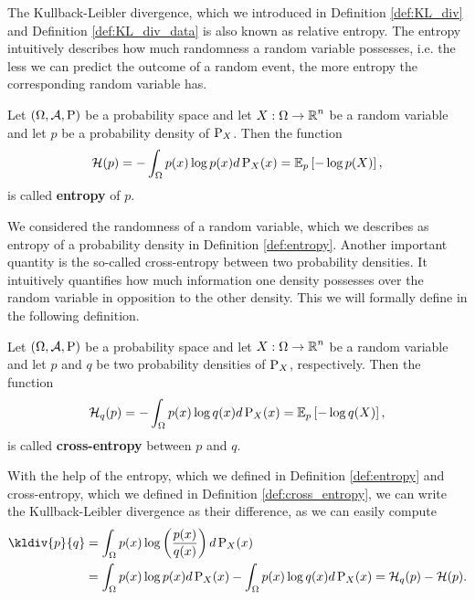 The Kullback-Leibler divergence, which we introduced in Definition \ref{def:KL_div} and Definition \ref{def:KL_div_data} is also known as relative entropy. The entropy intuitively describes how much \glqq randomness\grqq{} a random variable possesses, i.e. the less we can predict the outcome of a random event, the more entropy the corresponding random variable has.

\begin{definition}\label{def:entropy}
Let $(\Omega,\operatorname{\mathcal{A}}, \operatorname{\text{P}})$ be a probability space and let $X:\Omega \to \operatorname{\mathbb{R}}^n$ be a random variable and let $p$ be a probability density of $\operatorname{\text{P}}_X$. Then the function
\begin{align}
\mathcal{H}(p) = -\int_{\Omega} p(x) \log p(x)d\operatorname{\text{P}}_X(x) = \operatorname{\mathbb{E}}_p \left[ - \log p(X) \right],
\end{align}
is called \textbf{entropy} of $p$.
\end{definition}

We considered the \glqq randomness\grqq{} of a random variable, which we describes as entropy of a probability density in Definition \ref{def:entropy}. Another important quantity is the so-called cross-entropy between two probability densities. It intuitively quantifies how much information one density possesses over the random variable in opposition to the other density. This we will formally define in the following definition.

\begin{definition}\label{def:cross_entropy}
Let $(\Omega,\operatorname{\mathcal{A}}, \operatorname{\text{P}})$ be a probability space and let $X:\Omega \to \operatorname{\mathbb{R}}^n$ be a random variable and let $p$ and $q$ be two probability densities of $\operatorname{\text{P}}_X$, respectively. Then the function
\begin{align}
\mathcal{H}_q(p) = -\int_{\Omega} p(x) \log q(x)d\operatorname{\text{P}}_X(x) = \operatorname{\mathbb{E}}_p \left[ - \log q(X) \right],
\end{align}
is called \textbf{cross-entropy} between $p$ and $q$.
\end{definition}

With the help of the entropy, which we defined in Definition \ref{def:entropy} and cross-entropy, which we defined in Definition \ref{def:cross_entropy}, we can write the Kullback-Leibler divergence as their difference, as we can easily compute
\begin{align}\label{eq:kl_entropy}
\kldiv{p}{q} &= \int_\O p(x) \log \left( \frac{p(x)}{q(x)}\right) d\prob_X(x)\nonumber\\
 &=\int_\O p(x) \log p(x) d\prob_X(x) - \int_\O p(x) \log  q(x) d\prob_X(x) = \H_q(p) - \H(p).
\end{align}


